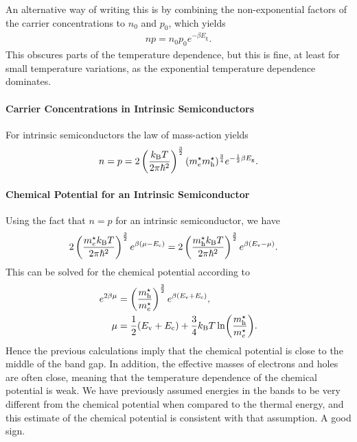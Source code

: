 An alternative way of writing this is by combining the non-exponential factors of the carrier concentrations to $n_{0}$ and $p_{0}$, which yields
\begin{align*}
	np = n_{0}p_{0}e^{-\beta E_{\text{g}}}.
\end{align*}
This obscures parts of the temperature dependence, but this is fine, at least for small temperature variations, as the exponential temperature dependence dominates.

\paragraph{Carrier Concentrations in Intrinsic Semiconductors}
For intrinsic semiconductors the law of mass-action yields
\begin{align*}
	n = p = 2\left(\frac{k_{\text{B}} T}{2\pi\hbar^{2}}\right)^{\frac{3}{2}}(m^{\star}_{e}m^{\star}_{\text{h}})^{\frac{3}{4}}e^{-\frac{1}{2}\beta E_{\text{g}}}.
\end{align*}

\paragraph{Chemical Potential for an Intrinsic Semiconductor}
Using the fact that $n = p$ for an intrinsic semiconductor, we have
\begin{align*}
	2\left(\frac{m^{\star}_{e}k_{\text{B}} T}{2\pi\hbar^{2}}\right)^{\frac{3}{2}}e^{\beta(\mu - E_{\text{c}})} &= 2\left(\frac{m^{\star}_{\text{h}}k_{\text{B}} T}{2\pi\hbar^{2}}\right)^{\frac{3}{2}}e^{\beta(E_{\text{v}} - \mu)}.
\end{align*}
This can be solved for the chemical potential according to
\begin{align*}
	e^{2\beta\mu} &= \left(\frac{m^{\star}_{\text{h}}}{m^{\star}_{e}}\right)^{\frac{3}{2}}e^{\beta(E_{\text{v}} + E_{\text{c}})}, \\
	\mu           &= \frac{1}{2}(E_{\text{v}} + E_{\text{c}}) + \frac{3}{4}k_{\text{B}} T\ln(\frac{m^{\star}_{\text{h}}}{m^{\star}_{e}}).
\end{align*}
Hence the previous calculations imply that the chemical potential is close to the middle of the band gap. In addition, the effective masses of electrons and holes are often close, meaning that the temperature dependence of the chemical potential is weak. We have previously assumed energies in the bands to be very different from the chemical potential when compared to the thermal energy, and this estimate of the chemical potential is consistent with that assumption. A good sign.

